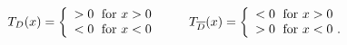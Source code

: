 \begin{equation}
T_D(x)= \left\{ \begin{array}{l}
                                >0 \ \; {\rm for} \ x>0 \\
                                <0 \ \; {\rm for} \  x<0
             \end{array} \right. \hspace{.3in}
T_{\overline{D}}(x)= \left\{ \begin{array}{l}
                                <0 \ \; {\rm for} \ x>0 \\
                                >0 \ \; {\rm for} \  x<0 \ .
             \end{array} \right.
\end{equation}

